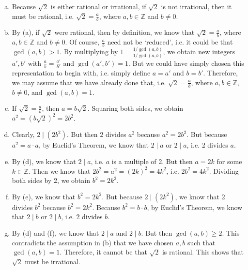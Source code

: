 \documentclass[11pt,letterpaper]{article}
\begin{document}
\sol 
\begin{enumerate}[(a)]
\item Because $\sqrt{2}$ is either rational or irrational, if $\sqrt{2}$ is not irrational, then it must be rational, i.e. $\sqrt{2}= \frac{a}{b}$, where $a, b \in \mathbb{Z}$ and $b \neq 0$. \pspace

\item By (a), if $\sqrt{2}$ were rational, then by definition, we know that $\sqrt{2}= \frac{a}{b}$, where $a, b \in \mathbb{Z}$ and $b \neq 0$. Of course, $\frac{a}{b}$ need not be `reduced', i.e. it could be that $\gcd(a, b) > 1$. By multiplying by $1= \frac{1/\gcd(a, b)}{1/\gcd(a, b)}$, we obtain new integers $a', b'$ with $\frac{a}{b}= \frac{a'}{b'}$ and $\gcd(a', b')= 1$. But we could have simply chosen this representation to begin with, i.e. simply define $a= a'$ and $b= b'$. Therefore, we may assume that we have already done that, i.e. $\sqrt{2}= \frac{a}{b}$, where $a, b \in \mathbb{Z}$, $b \neq 0$, and $\gcd(a, b)= 1$. \pspace

\item If $\sqrt{2}= \frac{a}{b}$, then $a= b \sqrt{2}$. Squaring both sides, we obtain $a^2= (b \sqrt{2})^2= 2b^2$. \pspace

\item Clearly, $2 \mid (2b^2)$. But then 2 divides $a^2$ because $a^2= 2b^2$. But because $a^2= a \cdot a$, by Euclid's Theorem, we know that $2 \mid a$ or $2 \mid a$, i.e. 2 divides $a$. \pspace

\item By (d), we know that $2 \mid a$, i.e. $a$ is a multiple of 2. But then $a= 2k$ for some $k \in \mathbb{Z}$. Then we know that $2b^2= a^2= (2k)^2= 4k^2$, i.e. $2b^2= 4k^2$. Dividing both sides by 2, we obtain $b^2=  2k^2$. \pspace

\item By (e), we know that $b^2= 2k^2$. But because $2 \mid (2k^2)$, we know that 2 divides $b^2$ because $b^2= 2k^2$. Because $b^2= b \cdot b$, by Euclid's Theorem, we know that $2 \mid b$ or $2 \mid b$, i.e. 2 divides $b$. \pspace

\item By (d) and (f), we know that $2 \mid a$ and $2 \mid b$. But then $\gcd(a, b) \geq 2$. This contradicts the assumption in (b) that we have chosen $a, b$ such that $\gcd(a, b)= 1$. Therefore, it cannot be that $\sqrt{2}$ is rational. This shows that $\sqrt{2}$ must be irrational. 
\end{enumerate}
\end{document}
